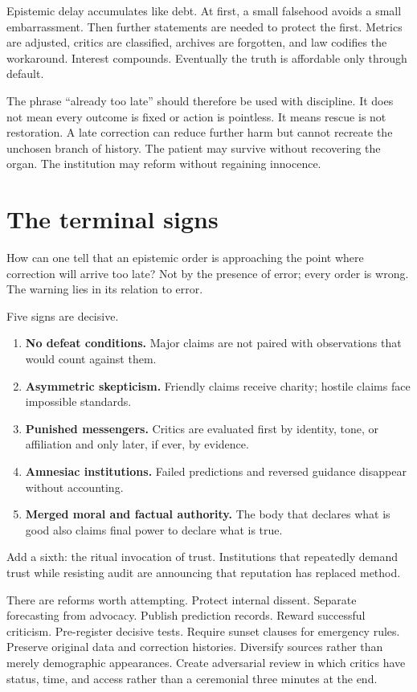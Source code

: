 ﻿\documentclass[12pt,a4paper]{book}
\begin{document}
Epistemic delay accumulates like debt. At first, a small falsehood avoids a small embarrassment. Then further statements are needed to protect the first. Metrics are adjusted, critics are classified, archives are forgotten, and law codifies the workaround. Interest compounds. Eventually the truth is affordable only through default.

The phrase “already too late” should therefore be used with discipline. It does not mean every outcome is fixed or action is pointless. It means rescue is not restoration. A late correction can reduce further harm but cannot recreate the unchosen branch of history. The patient may survive without recovering the organ. The institution may reform without regaining innocence.

\section{The terminal signs}

How can one tell that an epistemic order is approaching the point where correction will arrive too late? Not by the presence of error; every order is wrong. The warning lies in its relation to error.

Five signs are decisive.

\begin{enumerate}
  \item \textbf{No defeat conditions.} Major claims are not paired with observations that would count against them.
  \item \textbf{Asymmetric skepticism.} Friendly claims receive charity; hostile claims face impossible standards.
  \item \textbf{Punished messengers.} Critics are evaluated first by identity, tone, or affiliation and only later, if ever, by evidence.
  \item \textbf{Amnesiac institutions.} Failed predictions and reversed guidance disappear without accounting.
  \item \textbf{Merged moral and factual authority.} The body that declares what is good also claims final power to declare what is true.
\end{enumerate}

Add a sixth: the ritual invocation of trust. Institutions that repeatedly demand trust while resisting audit are announcing that reputation has replaced method.

There are reforms worth attempting. Protect internal dissent. Separate forecasting from advocacy. Publish prediction records. Reward successful criticism. Pre-register decisive tests. Require sunset clauses for emergency rules. Preserve original data and correction histories. Diversify sources rather than merely demographic appearances. Create adversarial review in which critics have status, time, and access rather than a ceremonial three minutes at the end.
\end{document}
